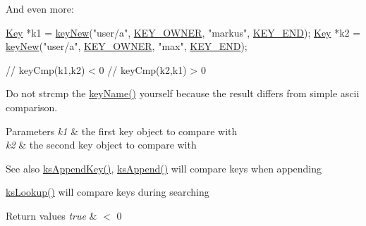 And even more\+: 
\begin{DoxyCode}
\hyperlink{classkdb_1_1Key_a5679f5cae63caddd64a60388b9cc77fa}{Key} *k1 = \hyperlink{group__key_gad23c65b44bf48d773759e1f9a4d43b89}{keyNew}(\textcolor{stringliteral}{"user/a"}, \hyperlink{group__key_gga91fb3178848bd682000958089abbaf40a77ca60362fa8daca8d5347db4385068b}{KEY\_OWNER}, \textcolor{stringliteral}{"markus"}, \hyperlink{group__key_gga91fb3178848bd682000958089abbaf40aa8adb6fcb92dec58fb19410eacfdd403}{KEY\_END});
\hyperlink{classkdb_1_1Key_a5679f5cae63caddd64a60388b9cc77fa}{Key} *k2 = \hyperlink{group__key_gad23c65b44bf48d773759e1f9a4d43b89}{keyNew}(\textcolor{stringliteral}{"user/a"}, \hyperlink{group__key_gga91fb3178848bd682000958089abbaf40a77ca60362fa8daca8d5347db4385068b}{KEY\_OWNER}, \textcolor{stringliteral}{"max"}, \hyperlink{group__key_gga91fb3178848bd682000958089abbaf40aa8adb6fcb92dec58fb19410eacfdd403}{KEY\_END});

\textcolor{comment}{// keyCmp(k1,k2) < 0}
\textcolor{comment}{// keyCmp(k2,k1) > 0}
\end{DoxyCode}


Do not strcmp the \hyperlink{group__keyname_ga8e805c726a60da921d3736cda7813513}{key\+Name()} yourself because the result differs from simple ascii comparison.


\begin{DoxyParams}{Parameters}
{\em k1} & the first key object to compare with \\
\hline
{\em k2} & the second key object to compare with\\
\hline
\end{DoxyParams}
\begin{DoxySeeAlso}{See also}
\hyperlink{group__keyset_gaa5a1d467a4d71041edce68ea7748ce45}{ks\+Append\+Key()}, \hyperlink{group__keyset_ga21eb9c3a14a604ee3a8bdc779232e7b7}{ks\+Append()} will compare keys when appending 

\hyperlink{group__keyset_gaa34fc43a081e6b01e4120daa6c112004}{ks\+Lookup()} will compare keys during searching
\end{DoxySeeAlso}

\begin{DoxyRetVals}{Return values}
{\em true} & $<$ 0 \\
\hline
\end{DoxyRetVals}
\mbox{\label{classkdb_1_1Key_addb92d7d52f80fc0cafa40d60fe0564f}} 
